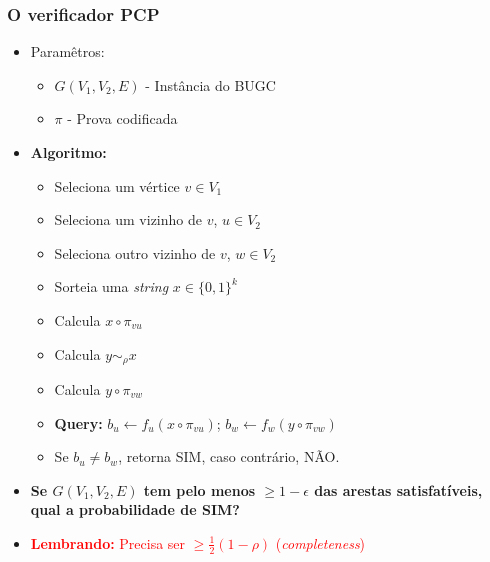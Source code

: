 \documentclass[11pt, handout]{beamer}
\newcommand{\red}[1]{\textcolor{red}{#1}}
\newcommand{\green}[1]{\textcolor{pine}{#1}}
\begin{document}
\begin{frame}[<+->]
\frametitle{O verificador PCP}
    \begin{itemize}
        \item Paramêtros: 
        \begin{itemize}
            \item $G(V_1, V_2, E)$ - Instância do BUGC
            \item $\pi$ - Prova codificada
    \end{itemize}
    \item \textbf{Algoritmo:}
    \begin{itemize}
        \item Seleciona um vértice $v\in V_1$
        \item Seleciona um vizinho de $v$, $u\in V_2$
        \item Seleciona outro vizinho de $v$, $w\in V_2$
        \item Sorteia uma \textit{string} $x\in \{0,1\}^k$
        \item Calcula $x\circ \pi_{vu}$ 
        \item Calcula $y\sim_\rho x$
        \item Calcula $y\circ \pi_{vw}$
        \item \textbf{Query:} $b_u \leftarrow{} f_u(x\circ \pi_{vu})$; $b_w \leftarrow{} f_w(y\circ \pi_{vw})$
        \item Se \green{$b_u \ne b_w$}, retorna \green{SIM}, caso contrário, NÃO.
    \end{itemize}
    \item \textbf{Se \green{$G(V_1,V_2,E)$} tem pelo menos \green{$\geq 1-\epsilon$} das arestas satisfatíveis, qual a probabilidade de \green{SIM}?}
    \item \red{\textbf{Lembrando:} Precisa ser $\geq \frac{1}{2}(1-\rho)$ (\textit{completeness})}
    \end{itemize}
\end{frame}{}
\end{document}
